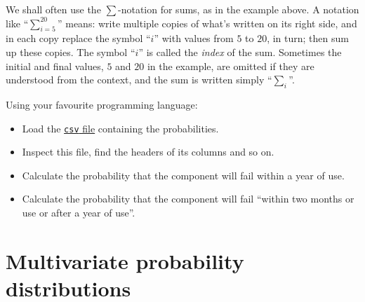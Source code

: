 \documentclass[
  a4paper,
  DIV=11,
  numbers=noendperiod,
  oneside]{scrreprt}
\providecommand{\tightlist}{%
  \setlength{\itemsep}{0pt}\setlength{\parskip}{0pt}}\usepackage{longtable,booktabs,array}
\begin{document}
\begin{tcolorbox}[enhanced jigsaw, colback=white, toptitle=1mm, title={Sum notation}, arc=.35mm, toprule=.15mm, rightrule=.15mm, coltitle=black, opacityback=0, colframe=quarto-callout-note-color-frame, bottomtitle=1mm, colbacktitle=quarto-callout-note-color!10!white, left=2mm, leftrule=.75mm, titlerule=0mm, breakable, opacitybacktitle=0.6, bottomrule=.15mm]

We shall often use the \(\sum\)-notation for sums, as in the example
above. A notation like {``\(\displaystyle\sum_{i=5}^{20}\)''} means:
write multiple copies of what's written on its right side, and in each
copy replace the symbol {``\(i\)''} with values from \(5\) to {\(20\),}
in turn; then sum up these copies. The symbol {``\(i\)''} is called the
\emph{index} of the sum. Sometimes the initial and final values, \(5\)
and \(20\) in the example, are omitted if they are understood from the
context, and the sum is written simply {``\(\displaystyle\sum_{i}\)''.}

\end{tcolorbox}

\begin{tcolorbox}[enhanced jigsaw, colback=white, toptitle=1mm, title={\faIcon{user-edit} Exercise}, arc=.35mm, toprule=.15mm, rightrule=.15mm, coltitle=black, opacityback=0, colframe=quarto-callout-caution-color-frame, bottomtitle=1mm, colbacktitle=quarto-callout-caution-color!10!white, left=2mm, leftrule=.75mm, titlerule=0mm, breakable, opacitybacktitle=0.6, bottomrule=.15mm]

Using your favourite programming language:

\begin{itemize}
\tightlist
\item
  Load the \href{datasets/failure_probability.csv}{\texttt{csv} file}
  containing the probabilities.
\item
  Inspect this file, find the headers of its columns and so on.
\item
  Calculate the probability that the component will fail within a year
  of use.
\item
  Calculate the probability that the component will fail ``within two
  months or use or after a year of use''.
\end{itemize}

\end{tcolorbox}

\hypertarget{multivariate-probability-distributions}{%
\chapter{Multivariate probability
distributions}\label{multivariate-probability-distributions}}
\end{document}
